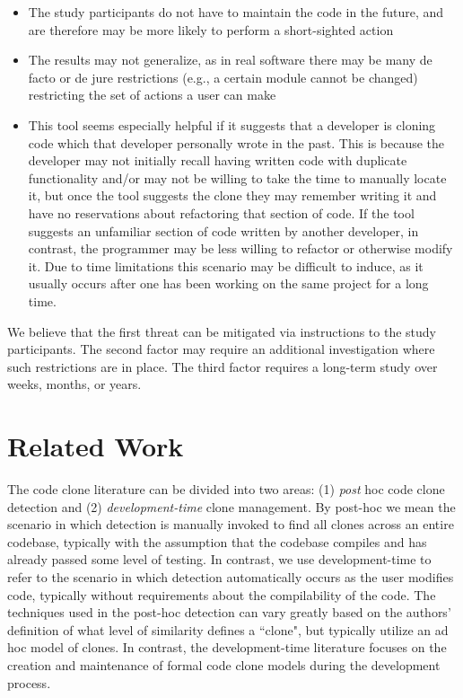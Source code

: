 \documentclass[nocopyrightspace,10pt]{sigplanconf}
\begin{document}
\begin{itemize}
  \item The study participants do not have to maintain the code in the
    future, and are therefore may be more likely to perform a
    short-sighted action
  \item The results may not generalize, as in real software there may
    be many de facto or de jure restrictions (e.g., a certain module cannot
    be changed) restricting the set of actions a user can make
  \item This tool seems especially helpful if it suggests that a
    developer is cloning code which that developer personally wrote in the
    past.  This is because the developer may not initially recall having written 
code with duplicate functionality and/or may not be willing to take the time to manually locate it,
but once the tool suggests the clone they may remember writing it and have no reservations about refactoring that section of code.
	If the tool suggests an unfamiliar section of code written by another developer, in contrast, the programmer may be less willing to refactor or otherwise modify it.
	Due to time limitations this scenario may be difficult to
    induce, as it usually occurs after one has been working on the
    same project for a long time.
\end{itemize}

We believe that the first threat can be mitigated via instructions to
the study participants. The second factor may require an additional
investigation where such restrictions are in place.  The third factor
requires a long-term study over weeks, months, or years.

\section{Related Work}
\label{sec:related}

The code clone literature can be divided into two areas: (1)
\emph{post} hoc code clone detection and
(2) \emph{development-time} clone management. By post-hoc we mean the scenario in which
detection is manually invoked to find all clones across an entire codebase, typically with the assumption that the codebase compiles and has already passed some level of testing.  In contrast, we use development-time to refer to the scenario in which detection automatically occurs as the user modifies code, typically without requirements about the compilability of the code.  The techniques used in the
post-hoc detection can vary greatly  based on the authors' definition of what 
level of similarity defines a ``clone", but typically utilize an
ad hoc model of clones. In contrast, the development-time literature focuses on
the creation and maintenance of formal code clone models during the
development process.
\end{document}
